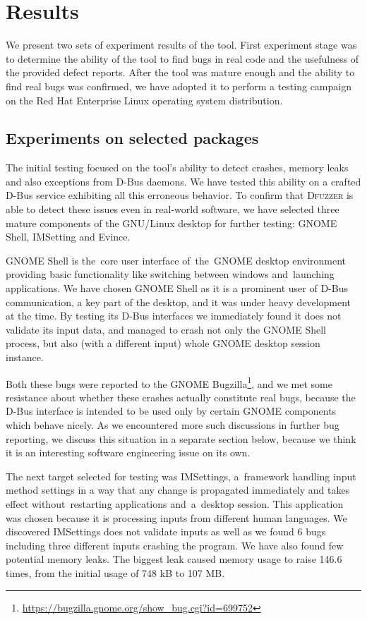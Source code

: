\documentclass[conference]{IEEEtran}
\begin{document}
\section{Results}
\label{sec:D}
We present two sets of experiment results of the tool. First experiment stage
was to determine the ability of the tool to find bugs in real code and the
usefulness of the provided defect reports. After the tool was mature enough and
the ability to find real bugs was confirmed, we have adopted it to perform a
testing campaign on the Red Hat Enterprise Linux operating system distribution.
 
\subsection{Experiments on selected packages}
The initial testing focused on the tool's ability to detect crashes, memory
leaks and also exceptions from D-Bus daemons. We have tested this ability
on a crafted D-Bus service exhibiting all this erroneous behavior.
To confirm that \textsc{Dfuzzer} is able to detect these issues even in
real-world software, we have selected three mature components of the GNU/Linux
desktop for further testing: GNOME Shell, IMSetting and Evince. 

GNOME Shell is the~core user interface of~the~GNOME desktop environment
providing basic functionality like switching between windows and~launching
applications. We have chosen GNOME Shell as it is a prominent user of D-Bus
communication, a key part of the desktop, and it was under heavy development
at the time.
By testing its D-Bus interfaces we immediately found it does not validate its
input data, and managed to crash not only the GNOME Shell process, but also
(with a different input) whole GNOME desktop session instance.

Both these bugs were reported to the GNOME Bugzilla\footnote{
\url{https://bugzilla.gnome.org/show_bug.cgi?id=699752}}, and we met
some resistance about whether these crashes actually constitute real bugs, because
the D-Bus interface is intended to be used only by certain GNOME components which behave
nicely. As we encountered more such discussions in further bug reporting, we
discuss this situation in a separate section below, because we think it is an
interesting software engineering issue on its own.

The next target selected for testing was IMSettings, a~framework handling input
method settings in a way that any change is propagated immediately and takes
effect without~restarting applications and~a~desktop session. This application
was chosen because it is processing inputs from different human languages.
We discovered IMSettings does not validate inputs as well as we found 6 bugs
including three different inputs crashing the program. We have also found few
potential memory leaks. The biggest leak caused memory usage to raise 146.6
times, from the initial usage of 748 kB to 107 MB.
\end{document}
